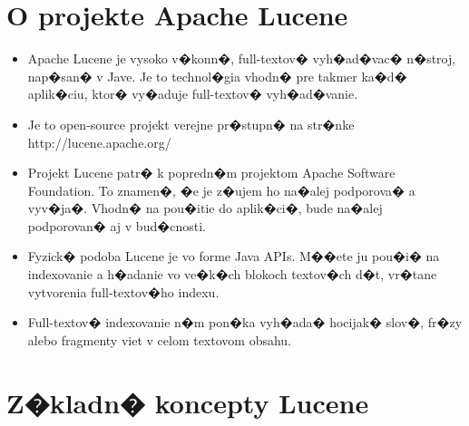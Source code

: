 \documentclass[11pt,a4paper]{article}
\begin{document}
\section{O projekte Apache Lucene}

\begin{itemize}
\item Apache Lucene je vysoko v�konn�, full-textov� vyh�ad�vac� n�stroj, nap�san� v Jave. Je to technol�gia vhodn� pre takmer ka�d� aplik�ciu, ktor� vy�aduje full-textov� vyh�ad�vanie.
\item Je to open-source projekt verejne pr�stupn� na str�nke http://lucene.apache.org/
\item Projekt Lucene patr� k popredn�m projektom Apache Software Foundation. To znamen�, �e je z�ujem ho na�alej podporova� a vyv�ja�. Vhodn� na pou�itie do aplik�ci�, bude na�alej podporovan� aj v bud�cnosti.
\item Fyzick� podoba Lucene je vo forme Java APIs. M��ete ju pou�i� na indexovanie a h�adanie vo ve�k�ch blokoch textov�ch d�t, vr�tane vytvorenia full-textov�ho indexu.
\item Full-textov� indexovanie n�m pon�ka vyh�ada� hocijak� slov�, fr�zy alebo fragmenty viet v celom textovom obsahu.
\end{itemize}

\newpage

\section{Z�kladn� koncepty Lucene}
\end{document}
